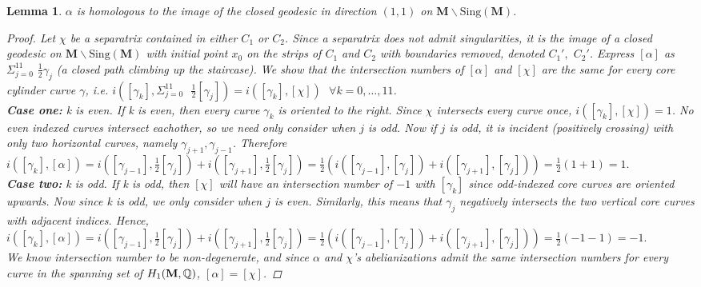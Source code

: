\documentclass[]{article}
\newtheorem{lem}{Lemma}[section]
\begin{document}
\begin{lem}
$\alpha$ is homologous to the image of the closed geodesic in direction $(1,1)$ on $\mathbf{M}\backslash\text{Sing}(\mathbf M)$.
\begin{proof}
Let $\chi$ be a separatrix contained in either $C_1$ or $C_2$. Since a separatrix does not admit singularities, it is the image of a closed geodesic on $\mathbf{M}\backslash\text{Sing}(\mathbf M)$ with initial point $x_0$ on the strips of $C_1$ and $C_2$ with boundaries removed, denoted $C_1',$ $C_2'$. Express $[\alpha]$ as $\Sigma^{11}_{j=0}$ $\frac{1}{2}\gamma_j$ (a closed path climbing up the staircase). We show that the intersection numbers of $[\alpha]$ and $[\chi]$ are the same for every core cylinder curve $\gamma$, i.e. $i([\gamma_k], \Sigma^{11}_{j=0} \text{ } \frac{1}{2}[\gamma_j])=i([\gamma_k],[\chi])\text{ } \forall k=0,\dots,11$.    \\
\textbf{Case one:} k is even. If k is even, then every curve $\gamma_k$ is oriented to the right. Since $\chi$ intersects every curve once, $i([\gamma_k],[\chi])=1$. No even indexed curves intersect eachother, so we need only consider when $j$ is odd. Now if $j$ is odd, it is incident (positively crossing) with only two horizontal curves, namely $\gamma_{j+1},\gamma_{j-1}$. Therefore $i([\gamma_k],[\alpha])=i([\gamma_{j-1}],\frac{1}{2}[\gamma_{j}])+i([\gamma_{j+1}],\frac{1}{2}[\gamma_{j}])=\frac{1}{2}(i([\gamma_{j-1}],[\gamma_{j}])+i([\gamma_{j+1}],[\gamma_{j}]))=\frac{1}{2}(1+1)=1.$\\
\textbf{Case two:} k is odd. If k is odd, then $[\chi]$ will have an intersection number of $-1$ with $[\gamma_k]$ since odd-indexed core curves are oriented upwards. Now since k is odd, we only consider when $j$ is even. Similarly, this means that $\gamma_j$ negatively intersects the two vertical core curves with adjacent indices. Hence, $i([\gamma_k],[\alpha])=i([\gamma_{j-1}],\frac{1}{2}[\gamma_{j}])+i([\gamma_{j+1}],\frac{1}{2}[\gamma_{j}])=\frac{1}{2}(i([\gamma_{j-1}],[\gamma_{j}])+i([\gamma_{j+1}],[\gamma_{j}]))=\frac{1}{2}(-1-1)=-1.$\\
We know intersection number to be non-degenerate, and since $\alpha$ and $\chi$'s abelianizations admit the same intersection numbers for every curve in the spanning set of $H_1(\textbf M, \mathbb{Q})$,  $[\alpha]=[\chi]$.
\end{proof}
\end{lem}
\end{document}
